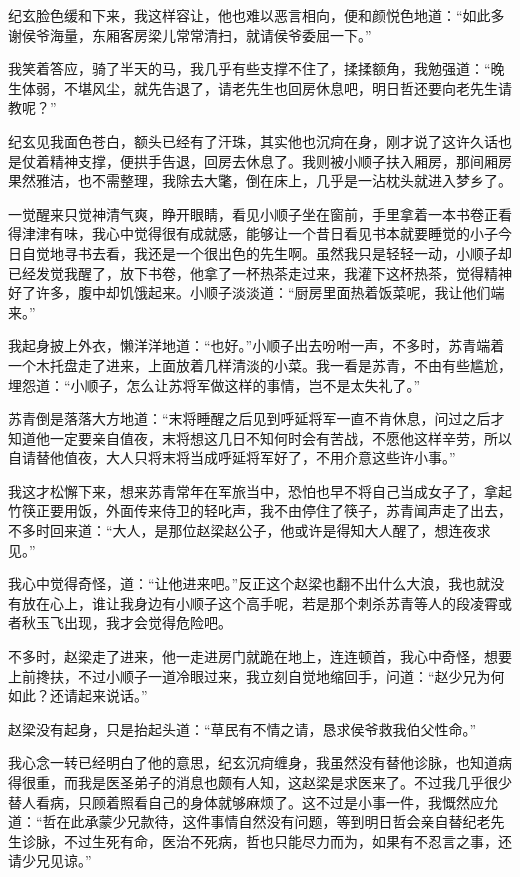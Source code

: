 纪玄脸色缓和下来，我这样容让，他也难以恶言相向，便和颜悦色地道：“如此多谢侯爷海量，东厢客房梁儿常常清扫，就请侯爷委屈一下。”

我笑着答应，骑了半天的马，我几乎有些支撑不住了，揉揉额角，我勉强道：“晚生体弱，不堪风尘，就先告退了，请老先生也回房休息吧，明日哲还要向老先生请教呢？”

纪玄见我面色苍白，额头已经有了汗珠，其实他也沉疴在身，刚才说了这许久话也是仗着精神支撑，便拱手告退，回房去休息了。我则被小顺子扶入厢房，那间厢房果然雅洁，也不需整理，我除去大氅，倒在床上，几乎是一沾枕头就进入梦乡了。

一觉醒来只觉神清气爽，睁开眼睛，看见小顺子坐在窗前，手里拿着一本书卷正看得津津有味，我心中觉得很有成就感，能够让一个昔日看见书本就要睡觉的小子今日自觉地寻书去看，我还是一个很出色的先生啊。虽然我只是轻轻一动，小顺子却已经发觉我醒了，放下书卷，他拿了一杯热茶走过来，我灌下这杯热茶，觉得精神好了许多，腹中却饥饿起来。小顺子淡淡道：“厨房里面热着饭菜呢，我让他们端来。”

我起身披上外衣，懒洋洋地道：“也好。”小顺子出去吩咐一声，不多时，苏青端着一个木托盘走了进来，上面放着几样清淡的小菜。我一看是苏青，不由有些尴尬，埋怨道：“小顺子，怎么让苏将军做这样的事情，岂不是太失礼了。”

苏青倒是落落大方地道：“末将睡醒之后见到呼延将军一直不肯休息，问过之后才知道他一定要亲自值夜，末将想这几日不知何时会有苦战，不愿他这样辛劳，所以自请替他值夜，大人只将末将当成呼延将军好了，不用介意这些许小事。”

我这才松懈下来，想来苏青常年在军旅当中，恐怕也早不将自己当成女子了，拿起竹筷正要用饭，外面传来侍卫的轻叱声，我不由停住了筷子，苏青闻声走了出去，不多时回来道：“大人，是那位赵梁赵公子，他或许是得知大人醒了，想连夜求见。”

我心中觉得奇怪，道：“让他进来吧。”反正这个赵梁也翻不出什么大浪，我也就没有放在心上，谁让我身边有小顺子这个高手呢，若是那个刺杀苏青等人的段凌霄或者秋玉飞出现，我才会觉得危险吧。

不多时，赵梁走了进来，他一走进房门就跪在地上，连连顿首，我心中奇怪，想要上前搀扶，不过小顺子一道冷眼过来，我立刻自觉地缩回手，问道：“赵少兄为何如此？还请起来说话。”

赵梁没有起身，只是抬起头道：“草民有不情之请，恳求侯爷救我伯父性命。”

我心念一转已经明白了他的意思，纪玄沉疴缠身，我虽然没有替他诊脉，也知道病得很重，而我是医圣弟子的消息也颇有人知，这赵梁是求医来了。不过我几乎很少替人看病，只顾着照看自己的身体就够麻烦了。这不过是小事一件，我慨然应允道：“哲在此承蒙少兄款待，这件事情自然没有问题，等到明日哲会亲自替纪老先生诊脉，不过生死有命，医治不死病，哲也只能尽力而为，如果有不忍言之事，还请少兄见谅。”

